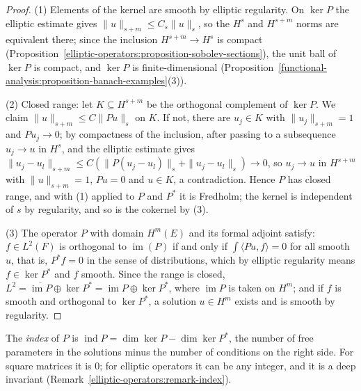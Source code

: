 \begin{proof}
(1) Elements of the kernel are smooth by elliptic regularity. On $\ker P$ the elliptic estimate gives $\|u\|_{s+m} \leq C_s\|u\|_s$, so the $H^{s}$ and $H^{s+m}$ norms are equivalent there; since the inclusion
$H^{s+m} \to H^s$ is compact (Proposition~\ref{elliptic-operators:proposition-sobolev-sections}), the unit ball of $\ker P$ is compact, and $\ker P$ is finite-dimensional
(Proposition~\ref{functional-analysis:proposition-banach-examples}(3)).

(2) Closed range: let $K \subseteq H^{s+m}$ be the orthogonal complement of $\ker P$. We claim $\|u\|_{s+m} \leq C\|Pu\|_s$ on $K$. If not, there are $u_j \in K$ with $\|u_j\|_{s+m} = 1$ and $Pu_j \to 0$; by
compactness of the inclusion, after passing to a subsequence $u_j \to u$ in $H^s$, and the elliptic estimate gives
$\|u_j - u_l\|_{s+m} \leq C(\|P(u_j - u_l)\|_s + \|u_j - u_l\|_s) \to 0$, so $u_j \to u$ in $H^{s+m}$ with $\|u\|_{s+m} = 1$, $Pu = 0$ and $u \in K$, a contradiction. Hence $P$ has closed range, and with (1)
applied to $P$ and $P^*$ it is Fredholm; the kernel is independent of $s$ by regularity, and so is the cokernel by (3).

(3) The operator $P$ with domain $H^m(E)$ and its formal adjoint satisfy: $f \in L^2(F)$ is orthogonal to $\operatorname{im}(P)$ if and only if $\int\langle Pu, f\rangle = 0$ for all smooth $u$, that is,
$P^*f = 0$ in the sense of distributions, which by elliptic regularity means $f \in \ker P^*$ and $f$ smooth. Since the range is closed, $L^2 = \overline{\operatorname{im}P} \oplus \ker P^* = \operatorname{im}P \oplus \ker P^*$, where
$\operatorname{im}P$ is taken on $H^m$; and if $f$ is smooth and orthogonal to $\ker P^*$, a solution $u \in H^m$ exists and is smooth by regularity.
\end{proof}

The \emph{index} of $P$ is $\operatorname{ind}P = \dim\ker P - \dim\ker P^*$, the number of free parameters in the solutions minus the number of conditions on the right side. For square matrices it is
$0$; for elliptic operators it can be any integer, and it is a deep invariant (Remark~\ref{elliptic-operators:remark-index}).

